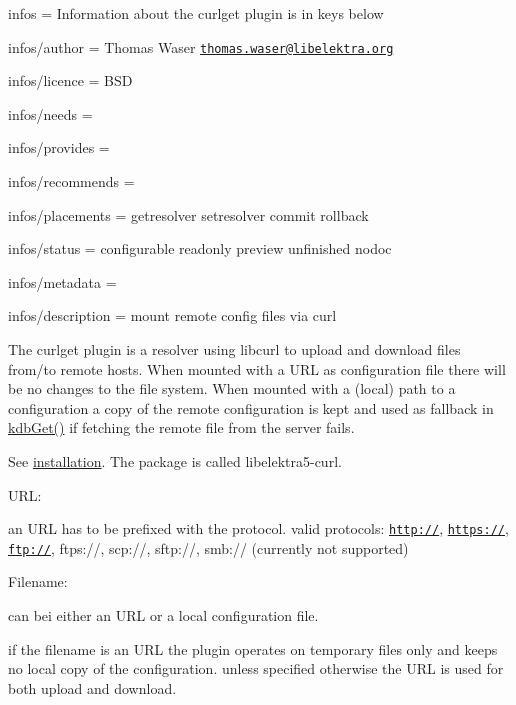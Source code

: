 
\begin{DoxyItemize}
\item infos = Information about the curlget plugin is in keys below
\item infos/author = Thomas Waser \href{mailto:thomas.waser@libelektra.org}{\tt thomas.\+waser@libelektra.\+org}
\item infos/licence = B\+SD
\item infos/needs =
\item infos/provides =
\item infos/recommends =
\item infos/placements = getresolver setresolver commit rollback
\item infos/status = configurable readonly preview unfinished nodoc
\item infos/metadata =
\item infos/description = mount remote config files via curl
\end{DoxyItemize}

The {\ttfamily curlget} plugin is a resolver using libcurl to upload and download files from/to remote hosts. When mounted with a {\ttfamily U\+RL} as configuration file there will be no changes to the file system. When mounted with a (local) path to a configuration a copy of the remote configuration is kept and used as fallback in {\ttfamily \hyperlink{group__kdb_ga28e385fd9cb7ccfe0b2f1ed2f62453a1}{kdb\+Get()}} if fetching the remote file from the server fails.

See \hyperlink{doc_INSTALL_md}{installation}. The package is called {\ttfamily libelektra5-\/curl}.

{\ttfamily U\+RL}\+:

an U\+RL has to be prefixed with the protocol. valid protocols\+: {\ttfamily \href{http://}{\tt http\+://}}, {\ttfamily \href{https://}{\tt https\+://}}, {\ttfamily \href{ftp://}{\tt ftp\+://}}, {\ttfamily ftps\+://}, {\ttfamily scp\+://}, {\ttfamily sftp\+://}, {\ttfamily smb\+://} (currently not supported)

{\ttfamily Filename}\+:

can bei either an {\ttfamily U\+RL} or a local configuration file.

if the filename is an {\ttfamily U\+RL} the plugin operates on temporary files only and keeps no local copy of the configuration. unless specified otherwise the {\ttfamily U\+RL} is used for both upload and download.


